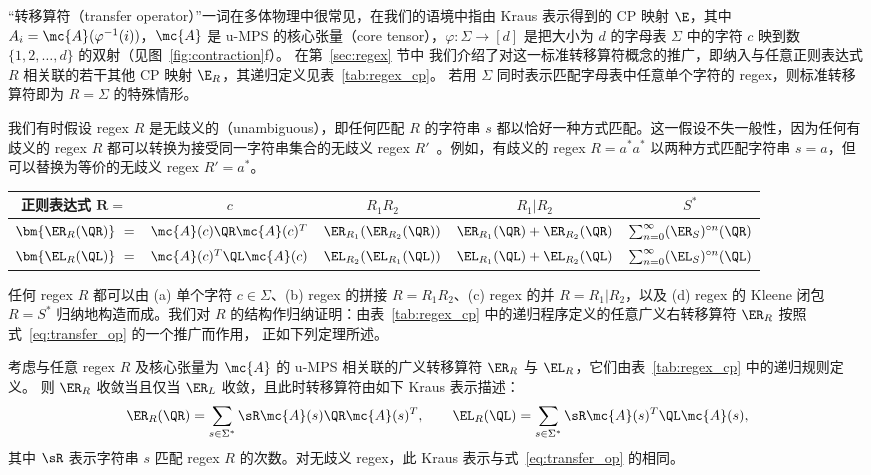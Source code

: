 ``转移算符（transfer operator）''一词在多体物理中很常见，在我们的语境中指由 Kraus 表示得到的 CP 映射 $\E$，其中 $A_i = \mc{A}(\varphi^{-1}(i))$，$\mc{A}$ 是 u-MPS 的核心张量（core tensor），$\varphi: \Sigma \to [d]$ 是把大小为 $d$ 的字母表 $\Sigma$ 中的字符 $c$ 映到数 $\{1, 2, \ldots, d\}$ 的双射（见图~\ref{fig:contraction}f）。
在第~\ref{sec:regex} 节中
我们介绍了对这一标准转移算符概念的推广，即纳入与任意正则表达式 $R$ 相关联的若干其他 CP 映射 $\E_R$，其递归定义见表~\ref{tab:regex_cp}。
若用 $\Sigma$ 同时表示匹配字母表中任意单个字符的 regex，则标准转移算符即为 $R = \Sigma$ 的特殊情形。

我们有时假设 regex $R$ 是无歧义的（unambiguous），即任何匹配 $R$ 的字符串 $s$ 都以恰好一种方式匹配。这一假设不失一般性，因为任何有歧义的 regex $R$ 都可以转换为接受同一字符串集合的无歧义 regex $R'$~\citep{book1971}。例如，有歧义的 regex $R = a^*a^*$ 以两种方式匹配字符串 $s = a$，但可以替换为等价的无歧义 regex $R' = a^*$。
%
\begin{table}[t]
\begin{center}
\begin{small}
\begin{sc}
\begin{tabular}{c|cccc}
    \textbf{正则表达式} $\mathbf{R =\ }$ & $c$ & $R_1 R_2$ & $R_1 | R_2$ & $S^*$ \\
    \midrule
    $\bm{\ER_R(\QR)}\ = $ & $\mc{A}(c) \QR \mc{A}(c)^T$ & $\ER_{R_1}(\ER_{R_2}(\QR))$ & $\ER_{R_1}(\QR) + \ER_{R_2}(\QR)$ & $\sum_{n=0}^\infty (\ER_S)^{\circ n}(\QR)$ \\
    $\bm{\EL_R(\QL)}\ = $ & $\mc{A}(c)^T \QL \mc{A}(c)$ & $\EL_{R_2}(\EL_{R_1}(\QL))$ & $\EL_{R_1}(\QL) + \EL_{R_2}(\QL)$ & $\sum_{n=0}^\infty (\EL_S)^{\circ n}(\QL)$
\end{tabular}
\end{sc}
\end{small}
\end{center}
\vskip -0.1in
\end{table}

任何 regex $R$ 都可以由 (a) 单个字符 $c\in\Sigma$、(b) regex 的拼接 $R = R_1 R_2$、(c) regex 的并 $R = R_1 | R_2$，以及 (d) regex 的 Kleene 闭包 $R = S^*$ 归纳地构造而成。我们对 $R$ 的结构作归纳证明：由表~\ref{tab:regex_cp} 中的递归程序定义的任意广义右转移算符 $\ER_R$
按照式~\ref{eq:transfer_op} 的一个推广而作用，
正如下列定理所述。

\begin{theorem}
\label{thm:transfer_op}
考虑与任意 regex $R$ 及核心张量为 $\mc{A}$ 的 u-MPS 相关联的广义转移算符 $\ER_R$ 与 $\EL_R$，它们由表~\ref{tab:regex_cp} 中的递归规则定义。
则 $\ER_R$ 收敛当且仅当 $\ER_L$ 收敛，且此时转移算符由如下 Kraus 表示描述：
\begin{equation}
\label{eq:gen_transfer_op}
\ER_R(\QR) = \sum_{s\in \Sigma^*} \sR \mc{A}(s) \QR \mc{A}(s)^T, \qquad \EL_R(\QL) = \sum_{s\in \Sigma^*} \sR \mc{A}(s)^T \QL \mc{A}(s),
\end{equation}
其中 $\sR$ 表示字符串 $s$ 匹配 regex $R$ 的次数。对无歧义 regex，此 Kraus 表示与式~\eqref{eq:transfer_op} 的相同。
\end{theorem}

